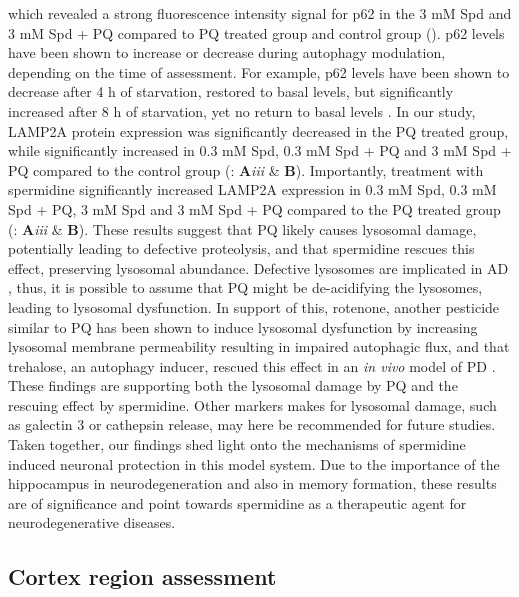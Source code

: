 which revealed a strong fluorescence intensity signal for p62 in the 3 mM Spd and 3 mM Spd + PQ compared to PQ treated group and control group (). p62 levels have been shown to increase or decrease during autophagy modulation, depending on the time of assessment. For example, p62 levels have been shown to decrease after 4 h of starvation, restored to basal levels, but significantly increased after 8 h of starvation, yet no return to basal levels \citep{sahani2014}. In our study, LAMP2A protein expression was significantly decreased in the PQ treated group, while significantly increased in 0.3 mM Spd, 0.3 mM Spd + PQ and 3 mM Spd + PQ compared to the control group (: \textbf{A}\textit{iii} \& \textbf{B}). Importantly, treatment with spermidine significantly increased LAMP2A expression in 0.3 mM Spd, 0.3 mM Spd + PQ, 3 mM Spd and 3 mM Spd + PQ compared to the PQ treated group (: \textbf{A}\textit{iii} \& \textbf{B}). These results suggest that PQ likely causes lysosomal damage, potentially leading to defective proteolysis, and that spermidine rescues this effect, preserving lysosomal abundance. Defective lysosomes are implicated in AD \citep{Nixon2011}, thus, it is possible to assume that PQ might be de-acidifying the lysosomes, leading to lysosomal dysfunction. In support of this, rotenone, another pesticide similar to PQ has been shown to induce lysosomal dysfunction by increasing lysosomal membrane permeability resulting in impaired autophagic flux, and that trehalose, an autophagy inducer, rescued this effect in an \textit{in vivo} model of PD \citep{Wu2015}. These findings are supporting both the lysosomal damage by PQ and the rescuing effect by spermidine. Other markers makes for lysosomal damage, such as galectin 3 or cathepsin release, may here be recommended for future studies. Taken together, our findings shed light onto the mechanisms of spermidine induced neuronal protection in this model system. Due to the importance of the hippocampus in neurodegeneration and also in memory formation, these results are of significance and point towards spermidine as a therapeutic agent for neurodegenerative diseases.

\subsection{Cortex region assessment}
